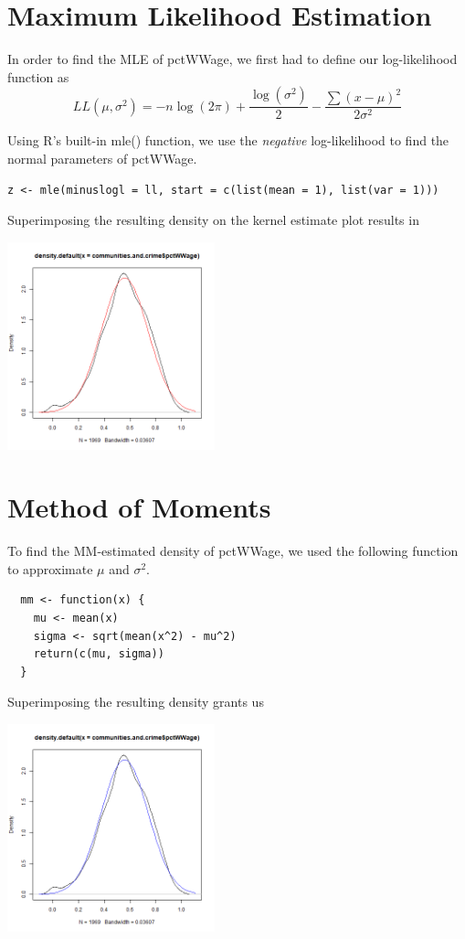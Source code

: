 \documentclass[12pt, letterpaper]{report}
\begin{document}
\section{Maximum Likelihood Estimation}
In order to find the MLE of pctWWage, we first had to define our log-likelihood function as
\begin{equation}
  LL(\mu, \sigma^2) = -n \log{(2\pi)} + \frac{\log{(\sigma^2)}}{2} - \frac{\sum(x-\mu)^2}{2\sigma^2}
\end{equation}

Using R's built-in mle() function, we use the \textit{negative} log-likelihood to find the normal parameters of pctWWage.
\begin{lstlisting}
z <- mle(minuslogl = ll, start = c(list(mean = 1), list(var = 1)))
\end{lstlisting} 

Superimposing the resulting density on the kernel estimate plot results in
\begin{center}
\includegraphics[width=0.45\textwidth]{normal/pctWWage_mle}
\end{center}


\section{Method of Moments}
To find the MM-estimated density of pctWWage, we used the following function to approximate $\mu$ and $\sigma^2$.
\begin{lstlisting}
  mm <- function(x) {
    mu <- mean(x)
    sigma <- sqrt(mean(x^2) - mu^2)
    return(c(mu, sigma))
  }  
\end{lstlisting} 

Superimposing the resulting density grants us
\begin{center}
\includegraphics[width=0.45\textwidth]{normal/pctWWage_mm}
\end{center}
\end{document}
